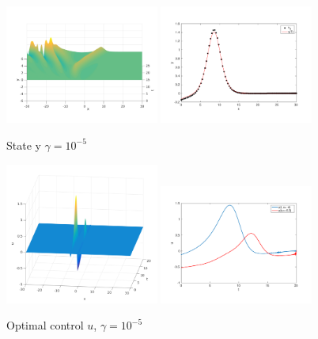 \begin{figure}[!h]
 \includegraphics[width = 0.45\textwidth]{images/ex2state3d.pdf}
 \includegraphics[width = 0.45\textwidth]{images/controlledstate.pdf}
 \caption{State y $\gamma = 10^{-5}$}
 \label{ex2fullgammadm5}
\end{figure}

\begin{figure}[!h]
 \includegraphics[width = 0.45\textwidth]{images/ex2optcontrol3d.png}
 \includegraphics[width = 0.45\textwidth]{images/ex2utime.pdf}
 \caption{Optimal control $u$, $\gamma = 10^{-5}$}
 \label{ex2fullgammadm5}
\end{figure}


\clearpage

